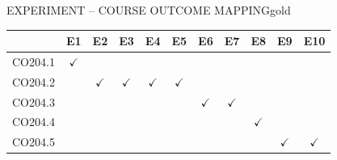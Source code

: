 \documentclass[11pt,a4paper]{article}
\begin{document}
\begin{secbox}{EXPERIMENT -- COURSE OUTCOME MAPPING}{gold}
\centering\sffamily\small
\renewcommand{\arraystretch}{1.25}
\begin{tabular}{l*{10}{c}}
\toprule
 & E1 & E2 & E3 & E4 & E5 & E6 & E7 & E8 & E9 & E10\\ \midrule
CO204.1 & $\checkmark$ & & & & & & & & & \\
CO204.2 & & $\checkmark$ & $\checkmark$ & $\checkmark$ & $\checkmark$ & & & & & \\
CO204.3 & & & & & & $\checkmark$ & $\checkmark$ & & & \\
CO204.4 & & & & & & & & $\checkmark$ & & \\
CO204.5 & & & & & & & & & $\checkmark$ & $\checkmark$\\
\bottomrule
\end{tabular}
\end{secbox}
\end{document}
